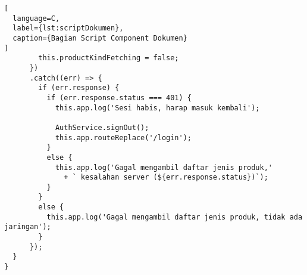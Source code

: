 \begin{lstlisting}[
  language=C,
  label={lst:scriptDokumen},
  caption={Bagian Script Component Dokumen}
]
        this.productKindFetching = false;
      })
      .catch((err) => {
        if (err.response) {
          if (err.response.status === 401) {
            this.app.log('Sesi habis, harap masuk kembali');

            AuthService.signOut();
            this.app.routeReplace('/login');
          }
          else {
            this.app.log('Gagal mengambil daftar jenis produk,'
              + ` kesalahan server (${err.response.status})`);
          }
        }
        else {
          this.app.log('Gagal mengambil daftar jenis produk, tidak ada jaringan');
        }
      });
  }
}
\end{lstlisting}
\vspace{0.5ex}